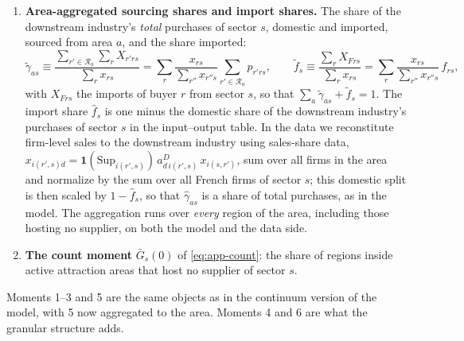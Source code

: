 \begin{enumerate}
    \item \textbf{Area-aggregated sourcing shares and import shares.} The share of the downstream industry's \emph{total} purchases of sector $s$, domestic and imported, sourced from area $a$, and the share imported:
    \begin{equation}
    \tilde\gamma_{as}\equiv\frac{\sum_{r'\in\mathcal{R}_{a}}\sum_{r}X_{r'rs}}{\sum_{r}x_{rs}}
    =\sum_{r}\frac{x_{rs}}{\sum_{r''}x_{r''s}}\sum_{r'\in\mathcal{R}_{a}}p_{r'rs},
    \qquad
    \tilde f_{s}\equiv\frac{\sum_{r}X_{Frs}}{\sum_{r}x_{rs}}=\sum_{r}\frac{x_{rs}}{\sum_{r''}x_{r''s}}\,f_{rs},
    \label{eq:app-gamma-area}
    \end{equation}
    with $X_{Frs}$ the imports of buyer $r$ from sector $s$, so that $\sum_a\tilde\gamma_{as}+\tilde f_s=1$. The import share $\hat f_s$ is one minus the domestic share of the downstream industry's purchases of sector $s$ in the input--output table. In the data we reconstitute firm-level sales to the downstream industry using sales-share data, $x_{i(r',s)d}=\mathbf{1}(\mathrm{Sup}_{i(r',s)})\,a^{D}_{d\,i(r',s)}\,x_{i(s,r')}$, sum over all firms in the area and normalize by the sum over all French firms of sector $s$; this domestic split is then scaled by $1-\hat f_s$, so that $\hat\gamma_{as}$ is a share of total purchases, as in the model. The aggregation runs over \emph{every} region of the area, including those hosting no supplier, on both the model and the data side.

    \item \textbf{The count moment} $\bar G_{s}(0)$ of \eqref{eq:app-count}: the share of regions inside active attraction areas that host no supplier of sector $s$.
\end{enumerate}

Moments 1--3 and 5 are the same objects as in the continuum version of the model, with 5 now aggregated to the area. Moments 4 and 6 are what the granular structure adds.

